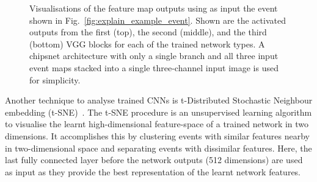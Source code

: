 \begin{figure}
{    }
    \quad
    \caption[Visualisations of trained feature map outputs]
    {Visualisations of the feature map outputs using as input the event shown in
        Fig.~\ref{fig:explain_example_event}. Shown are the activated outputs from the first
        (top), the second (middle), and the third (bottom) VGG blocks for each of the trained
        network types. A chipsnet architecture with only a single branch and all three input event
        maps stacked into a single three-channel input image is used for simplicity.}
    \label{fig:cnn_visualisations}
\end{figure}

Another technique to analyse trained CNNs is t-Distributed Stochastic Neighbour embedding
(t-SNE)~\cite{maaten2008}. The t-SNE procedure is an unsupervised learning algorithm to visualise
the learnt high-dimensional feature-space of a trained network in two dimensions. It accomplishes
this by clustering events with similar features nearby in two-dimensional space and separating
events with dissimilar features. Here, the last fully connected layer before the network outputs
(512 dimensions) are used as input as they provide the best representation of the learnt network
features.

